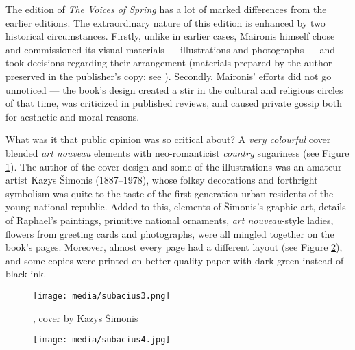 \begin{paper}
The \citeyear{maironis_pavasario_1920} edition of \emph{The Voices of Spring} has a lot of marked
differences from the earlier editions. The
extraordinary nature of this edition is enhanced by two historical circumstances. Firstly,
unlike in earlier cases, Maironis himself chose and commissioned its
visual materials --- illustrations and photographs --- and took decisions
regarding their arrangement (materials prepared by the author preserved
in the publisher's copy; see \citealt{maironis_pavasario_1918}). Secondly, Maironis'
efforts did not go unnoticed --- the book's design created a stir in the
cultural and religious circles of that time, was criticized in published
reviews, and caused private gossip both for aesthetic and moral
reasons.

What was it that public opinion was so critical about? A \emph{very
colourful} cover blended \emph{art nouveau} elements with
neo-romanticist \emph{country} sugariness (see Figure \ref{fig:subacius:maironis1920cover}). The author of the
cover design and some of the illustrations was an amateur artist Kazys
Šimonis (1887--1978), whose folksy decorations and forthright
symbolism was quite to the taste of the first-generation urban residents
of the young national republic. Added to this, elements of Šimonis's graphic art, details of Raphael's
paintings, primitive national ornaments, \emph{art nouveau}-style
ladies, flowers from greeting cards and photographs, were all mingled
together on the book's pages. Moreover, almost every page had a
different layout (see Figure \ref{fig:subacius:maironis1920spread}), and some copies were printed on better
quality paper with dark green instead of black ink.

\begin{figure}
\centering
\texttt{[image: media/subacius3.png]}
\caption{\citealt{maironis_pavasario_1920}, cover by Kazys Šimonis}
\label{fig:subacius:maironis1920cover}
\end{figure}

\begin{figure}
\centering
\texttt{[image: media/subacius4.jpg]}
\caption{\citealt[18--19]{maironis_pavasario_1920}}
\label{fig:subacius:maironis1920spread}
\end{figure}


\end{paper}
